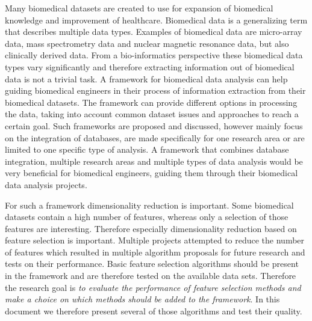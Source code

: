 \documentclass[10pt,a4paper]{article}
\begin{document}
	Many biomedical datasets are created to use for expansion of biomedical knowledge and improvement of healthcare. Biomedical data is a generalizing term that describes multiple data types\cite{gehlenborg2010visualization}. Examples of biomedical data are micro-array data\cite{brazma2001minimum}, mass spectrometry data\cite{cottrell1999probability, dettmer2007mass} and nuclear magnetic resonance data\cite{capitani2017nuclear}, but also clinically derived data\cite{liu2012data, sittig2008grand}. From a bio-informatics perspective these biomedical data types vary significantly\cite{gehlenborg2010visualization} and therefore extracting information out of biomedical data is not a trivial task. A framework for biomedical data analysis can help guiding biomedical engineers in their process of information extraction from their biomedical datasets. The framework can provide different options in processing the data, taking into account common dataset issues\cite{bertolazzi2008logic, piatetsky2003microarray,lommen2009metalign} and approaches to reach a certain goal\cite{holzinger2014knowledge, wilkins2009proteomics}. Such frameworks are proposed and discussed, however mainly focus on the integration of databases\cite{teodoro2009biomedical, doi:10.1093/nar/gkm1037}, are made specifically for one research area\cite{sturn2002genesis, karnovsky2011metscape, tabas2012genecodis3} or are limited to one specific type of analysis\cite{faul2007g}. A framework that combines database integration, multiple research areas and multiple types of data analysis would be very beneficial for biomedical engineers, guiding them through their biomedical data analysis projects.
	
	For such a framework dimensionality reduction is important. Some biomedical datasets contain a high number of features, whereas only a selection of those features are interesting. Therefore especially dimensionality reduction based on feature selection is important. Multiple projects attempted to reduce the number of features\cite{baumgartner2006data, welthagen2005comprehensive} which resulted in multiple algorithm proposals for future research\cite{lim2003planar, peng2010novel, biesiada2007feature, ding2005minimum} and tests on their performance\cite{catal2009investigating, liu2002comparative}. Basic feature selection algorithms should be present in the framework and are therefore tested on the available data sets. Therefore the research goal is \emph{to evaluate the performance of feature selection methods and make a choice on which methods should be added to the framework}. In this document we therefore present several of those algorithms and test their quality.
	
\end{document}
